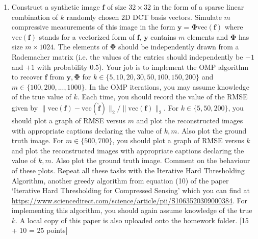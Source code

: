 \documentclass[11pt]{article}
\begin{document}
\begin{enumerate}
\item Construct a synthetic image $\boldsymbol{f}$ of size $32 \times 32$ in the form of a sparse linear combination of $k$ randomly chosen 2D DCT basis vectors. Simulate $m$ compressive measurements of this image in the form $\boldsymbol{y} = \boldsymbol{\Phi} \text{vec}(\boldsymbol{f})$ where $\text{vec}(\boldsymbol{f})$ stands for a vectorized form of $\boldsymbol{f}$, $\boldsymbol{y}$ contains $m$ elements and $\boldsymbol{\Phi}$ has size $m \times 1024$. The elements of $\boldsymbol{\Phi}$ should be independently drawn from a Rademacher matrix (i.e. the values of the entries should independently be $-1$ and $+1$ with probability $0.5$). Your job is to implement the OMP algorithm to recover $\boldsymbol{f}$ from $\boldsymbol{y}, \boldsymbol{\Phi}$ for $k \in \{5,10,20,30,50,100,150,200\}$ and $m \in \{100,200,...,1000\}$. In the OMP iterations, you may assume knowledge of the true value of $k$. Each time, you should record the value of the RMSE given by $\|\text{vec}(\boldsymbol{f}) - \text{vec}(\boldsymbol{\hat{f}})\|_2/\|\text{vec}(\boldsymbol{f})\|_2$. For $k \in \{5,50,200\}$, you should plot a graph of RMSE versus $m$ and plot the reconstructed images with appropriate captions declaring the value of $k,m$. Also plot the ground truth image. For $m \in \{500,700\}$, you should plot a graph of RMSE versus $k$ and plot the reconstructed images with appropriate captions declaring the value of $k,m$. Also plot the ground truth image. Comment on the behaviour of these plots. Repeat all these tasks with the Iterative Hard Thresholding Algorithm, another greedy algorithm from equation (10) of the paper `Iterative Hard Thresholding for Compressed Sensing' which you can find at \url{https://www.sciencedirect.com/science/article/pii/S1063520309000384}. For implementing this algorithm, you should again assume knowledge of the true $k$. A local copy of this paper is also uploaded onto the homework folder. \textsf{[15 + 10 = 25 points]}
\end{enumerate}
\end{document}
